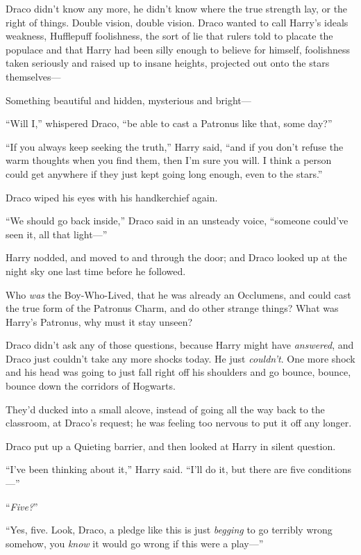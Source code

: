 Draco didn’t know any more, he didn’t know where the true strength lay, or the right of things. Double vision, double vision. Draco wanted to call Harry’s ideals weakness, Hufflepuff foolishness, the sort of lie that rulers told to placate the populace and that Harry had been silly enough to believe for himself, foolishness taken seriously and raised up to insane heights, projected out onto the stars themselves—

Something beautiful and hidden, mysterious and bright—

“Will I,” whispered Draco, “be able to cast a Patronus like that, some day?”

“If you always keep seeking the truth,” Harry said, “and if you don’t refuse the warm thoughts when you find them, then I’m sure you will. I think a person could get anywhere if they just kept going long enough, even to the stars.”

Draco wiped his eyes with his handkerchief again.

“We should go back inside,” Draco said in an unsteady voice, “someone could’ve seen it, all that light—”

Harry nodded, and moved to and through the door; and Draco looked up at the night sky one last time before he followed.

Who \emph{was} the Boy-Who-Lived, that he was already an Occlumens, and could cast the true form of the Patronus Charm, and do other strange things? What was Harry’s Patronus, why must it stay unseen?

Draco didn’t ask any of those questions, because Harry might have \emph{answered}, and Draco just couldn’t take any more shocks today. He just \emph{couldn’t}. One more shock and his head was going to just fall right off his shoulders and go bounce, bounce, bounce down the corridors of Hogwarts.

\later

They’d ducked into a small alcove, instead of going all the way back to the classroom, at Draco’s request; he was feeling too nervous to put it off any longer.

Draco put up a Quieting barrier, and then looked at Harry in silent question.

“I’ve been thinking about it,” Harry said. “I’ll do it, but there are five conditions—”

“\emph{Five?}”

“Yes, five. Look, Draco, a pledge like this is just \emph{begging} to go terribly wrong somehow, you \emph{know} it would go wrong if this were a play—”

